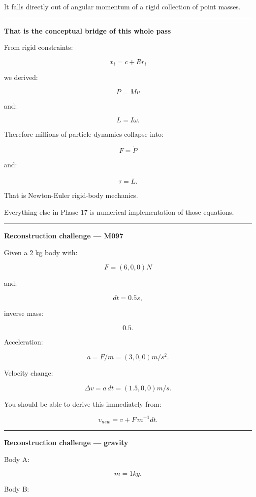 It falls directly out of angular momentum of a rigid collection of point masses.

\begin{center}\rule{0.5\linewidth}{0.5pt}\end{center}

\textbf{That is the conceptual bridge of this whole pass}

From rigid constraints:

\[
x_i=c+Rr_i
\]

we derived:

\[
P=Mv
\]

and:

\[
L=I\omega.
\]

Therefore millions of particle dynamics collapse into:

\[
\boxed{
F=\dot P
}
\]

and:

\[
\boxed{
\tau=\dot L.
}
\]

That is Newton-Euler rigid-body mechanics.

Everything else in Phase 17 is numerical implementation of those equations.

\begin{center}\rule{0.5\linewidth}{0.5pt}\end{center}

\textbf{Reconstruction challenge --- M097}

Given a 2 kg body with:

\[
F=(6,0,0)N
\]

and:

\[
dt=0.5s,
\]

inverse mass:

\[
0.5.
\]

Acceleration:

\[
a=
F/m
=
(3,0,0)m/s^2.
\]

Velocity change:

\[
\Delta v
=
a\,dt
=
(1.5,0,0)m/s.
\]

You should be able to derive this immediately from:

\[
v_{new}
=
v+
F\,m^{-1}dt.
\]

\begin{center}\rule{0.5\linewidth}{0.5pt}\end{center}

\textbf{Reconstruction challenge --- gravity}

Body A:

\[
m=1kg.
\]

Body B:

